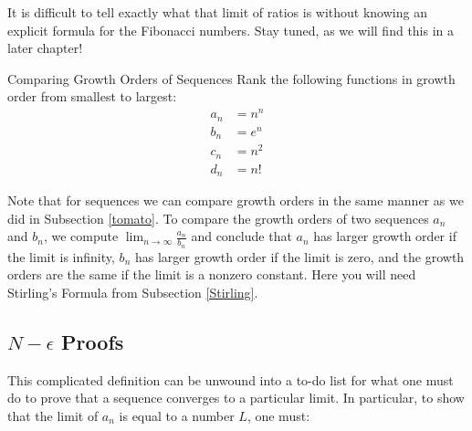 It is difficult to tell exactly what that limit of ratios is without knowing an explicit formula for the Fibonacci numbers.  Stay tuned, as we will find this in a later chapter!  

\begin{exercise}{Comparing Growth Orders of Sequences \Coffeecup \Coffeecup }
Rank the following functions in growth order from smallest to largest: \begin{align*}
a_n&=n^n \\
b_n&=e^n \\
c_n&=n^2 \\
d_n&=n!
\end{align*}

Note that for sequences we can compare growth orders in the same manner as we did in Subsection \ref{tomato}.  To compare the growth orders of two sequences $a_n$ and $b_n$, we compute $\lim_{n\to \infty} \frac{a_n}{b_n}$ and conclude that $a_n$ has larger growth order if the limit is infinity, $b_n$ has larger growth order if the limit is zero, and the growth orders are the same if the limit is a nonzero constant. Here you will need Stirling's Formula from Subsection \ref{Stirling}.
\end{exercise}


\subsection{$N-\epsilon$ Proofs}

This complicated definition can be unwound into a to-do list for what one must do to prove that a sequence converges to a particular limit.  In particular, to show that the limit of $a_n$ is equal to a number $L$, one must:

